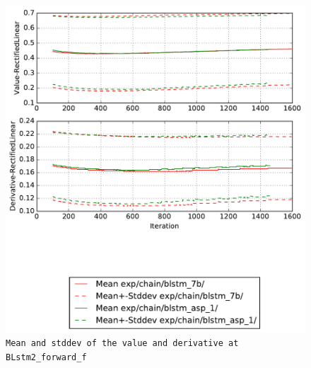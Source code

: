 \documentclass[prl,10pt,twocolumn]{revtex4}
\begin{document}
\newpage
\begin{figure}[h]
  \begin{center}
    \caption{\texttt{Mean and stddev of the value and derivative at BLstm2\_forward\_f}}
    \includegraphics[width=\textwidth]{exp/chain/blstm_7b/report/nonlinstats_BLstm2_forward_f.pdf}
  \end{center}
\end{figure}
\clearpage
\end{document}
